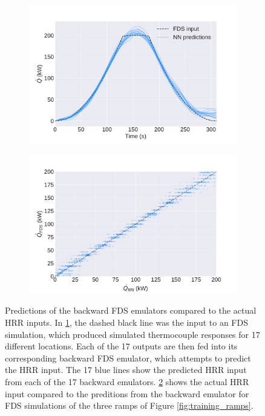 \documentclass{article}
\begin{document}
\begin{figure}[htbp]
  \centering
  \begin{subfigure}[t]{.45\textwidth}
      \centering
      \includegraphics[width=\textwidth,keepaspectratio]{figures/backward_NN_examples.pdf}
      \caption{}
      \label{fig:backward_NN_examples}
  \end{subfigure}
  \begin{subfigure}[t]{.45\textwidth}
      \centering
      \includegraphics[width=\textwidth ,keepaspectratio]{figures/backward_error_scatter.pdf}
      \caption{}
      \label{fig:backward_error_scatter}
  \end{subfigure}
  \caption{Predictions of the backward FDS emulators compared to the actual HRR inputs. In \protect\ref{fig:backward_NN_examples}, the dashed black line was the input to an FDS simulation, which produced simulated thermocouple responses for 17 different locations. Each of the 17 outputs are then fed into its corresponding backward FDS emulator, which attempts to predict the HRR input. The 17 blue lines show the predicted HRR input from each of the 17 backward emulators. \protect\ref{fig:backward_error_scatter} shows the actual HRR input compared to the preditions from the backward emulator for FDS simulations of the three ramps of Figure \protect\ref{fig:training_ramps}.} 
  \label{fig:backward_examples}
\end{figure}
\end{document}
